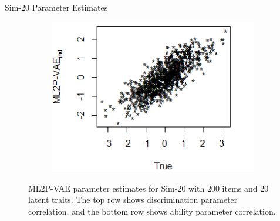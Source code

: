 \documentclass{beamer}
\theoremstyle{definition}
\begin{document}
\begin{frame}{Sim-20 Parameter Estimates}
\begin{figure}[h]
\begin{subfigure}{.32\textwidth}
    \end{subfigure}
    \begin{subfigure}{.32\textwidth}
      \centering
      \includegraphics[width=.9\linewidth]{../img/ml_journal_results/20skills/vae_ind_theta_20skills.png}
    \end{subfigure}
    \caption{ML2P-VAE parameter estimates for Sim-20 with 200 items and 20 latent traits. The top row shows discrimination parameter correlation, and the bottom row shows ability parameter correlation.}
    \label{fig:20skill_cor}
\end{figure}


\end{frame}
\end{document}
